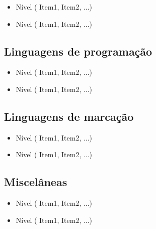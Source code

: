 \documentclass[a4paper,12pt]{memoir} %
\begin{document}
\begin{itemize}
	\item Nível ( Item1, Item2, ...)
	\item Nível ( Item1, Item2, ...)
\end{itemize}

\subsection*{Linguagens de programação}

\begin{itemize}
	\item Nível ( Item1, Item2, ...)
	\item Nível ( Item1, Item2, ...)
\end{itemize}

\subsection*{Linguagens de marcação}

\begin{itemize}
	\item Nível ( Item1, Item2, ...)
	\item Nível ( Item1, Item2, ...)
\end{itemize}

\subsection*{Miscelâneas}

\begin{itemize}
	\item Nível ( Item1, Item2, ...)
	\item Nível ( Item1, Item2, ...)
\end{itemize}

\end{document}
